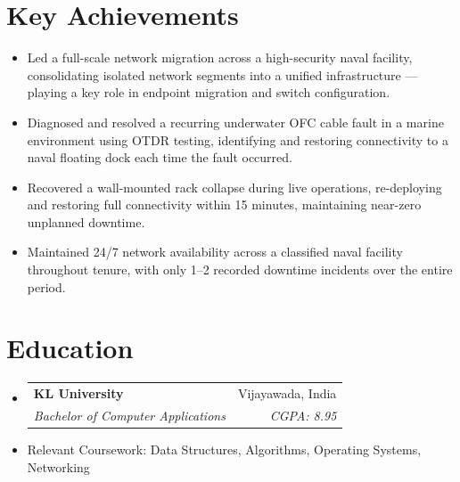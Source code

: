 \documentclass[letterpaper,11pt]{article}
\makeatletter
\newcommand{\resumeItem}[1]{
  \item\small{
    {#1 \vspace{-2pt}}
  }
}
\newcommand{\resumeSubheading}[4]{
  \vspace{-2pt}\item
    \begin{tabular*}{0.97\textwidth}[t]{l@{\extracolsep{\fill}}r}
      \textbf{#1} & #2 \\
      \textit{\small#3} & \textit{\small #4} \\
    \end{tabular*}\vspace{-7pt}
}
\newcommand{\resumeSubHeadingListStart}{\begin{itemize}[leftmargin=0.15in, label={}]}
\newcommand{\resumeSubHeadingListEnd}{\end{itemize}}
\newcommand{\resumeItemListStart}{\begin{itemize}}
\newcommand{\resumeItemListEnd}{\end{itemize}\vspace{-5pt}}
\makeatother
\begin{document}
\section{Key Achievements}
    \resumeItemListStart
    \resumeItem{Led a full-scale network migration across a high-security naval facility, consolidating isolated network segments into a unified infrastructure — playing a key role in endpoint migration and switch configuration.}
    \resumeItem{Diagnosed and resolved a recurring underwater OFC cable fault in a marine environment using OTDR testing, identifying and restoring connectivity to a naval floating dock each time the fault occurred.}
    \resumeItem{Recovered a wall-mounted rack collapse during live operations, re-deploying and restoring full connectivity within 15 minutes, maintaining near-zero unplanned downtime.}
    \resumeItem{Maintained 24/7 network availability across a classified naval facility throughout tenure, with only 1–2 recorded downtime incidents over the entire period.}
    \resumeItemListEnd


\section{Education}
  \resumeSubHeadingListStart
    \resumeSubheading
      {KL University}{Vijayawada, India}
      {Bachelor of Computer Applications}{CGPA: 8.95}
      \resumeItem{Relevant Coursework: Data Structures, Algorithms, Operating Systems, Networking}
  \resumeSubHeadingListEnd


\end{document}
